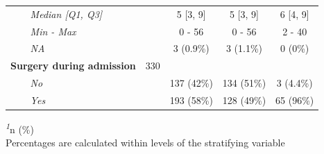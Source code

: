 \documentclass[
]{article}
\begin{document}
\begin{table}[t]
\begin{tabular*}{0.7\linewidth}{@{\extracolsep{\fill}}lcccc}
{\itshape     Median {[}Q1, Q3{]}} &  & 5 {[}3, 9{]} & 5 {[}3, 9{]} & 6 {[}4, 9{]} \\ 
{\itshape     Min - Max} &  & 0 - 56 & 0 - 56 & 2 - 40 \\ 
{\itshape     NA} &  & 3 (0.9\%) & 3 (1.1\%) & 0 (0\%) \\ 
{\bfseries Surgery during admission} & 330 &  &  &  \\ 
{\itshape     No} &  & 137 (42\%) & 134 (51\%) & 3 (4.4\%) \\ 
{\itshape     Yes} &  & 193 (58\%) & 128 (49\%) & 65 (96\%) \\ 
\bottomrule
\end{tabular*}
\begin{minipage}{\linewidth}
\textsuperscript{\textit{1}}n (\%)\\
Percentages are calculated within levels of the stratifying 
    variable\\
\end{minipage}
\end{table}
\end{document}
